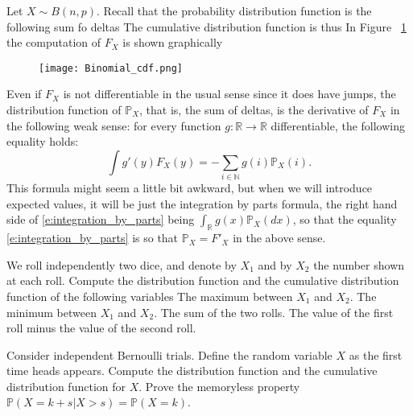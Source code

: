 \begin{example}

Let $X \sim B(n,p)$. Recall that the probability distribution function is the following sum fo deltas 
The cumulative distribution function is thus 
In Figure ~\ref{f:Binomial_cdf} the computation of $F_X$ is shown graphically 
\begin{figure}[h!]
\texttt{[image: Binomial\_cdf.png]}
\label{f:Binomial_cdf}
\end{figure}

\end{example}

Even if $F_X$ is not differentiable in the usual sense since it does have jumps, the distribution function of $\mathbb P_X$, that is, the sum of deltas, is the derivative of $F_X$ in the following weak sense: for every function $g: \mathbb R \to \mathbb R $ differentiable, the following equality holds:   
\begin{equation}
\label{e:integration_by_parts}
\int g'(y) F_X(y) = - \sum_{i \in \mathbb N } g(i) \mathbb P_X(i). 
\end{equation}
This formula might seem a little bit awkward, but when we will introduce expected values, it will be just the integration by parts formula, the right hand side of \eqref{e:integration_by_parts} being $\int_{\mathbb R} g(x) \mathbb P_X(dx)$, so that the equality \eqref{e:integration_by_parts}  is 
so that $\mathbb P_X = F'_X$ in the above sense. 

\begin{ExerciseList}

    \Exercise We roll independently two dice, and denote by $X_1$ and by $X_2$ the number shown at each roll. Compute the distribution function and the cumulative distribution function of the following variables
        \Question The maximum between $X_1$ and $X_2$.
        \Question The minimum between $X_1$ and $X_2$. 
        \Question The sum of the two rolls. 
        \Question The value of the first roll minus the value of the second roll. 
        
        \Exercise Consider independent Bernoulli trials. Define the random variable $X$ as the  first time heads appears. Compute the distribution function and the cumulative distribution function for $X$. Prove the memoryless property $\mathbb P ( X = k + s| X > s ) = \mathbb P(X = k )$.  
\end{ExerciseList}

